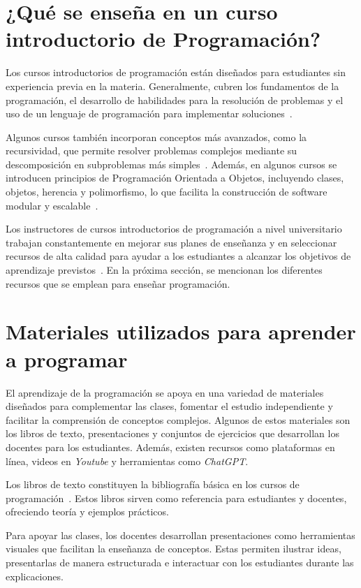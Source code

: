 \documentclass{article}
\begin{document}
\section{¿Qué se enseña en un curso introductorio de Programación?}\label{sec:contents}

Los cursos introductorios de programación están diseñados para estudiantes sin experiencia previa en la materia. Generalmente, cubren los fundamentos de la programación, el desarrollo de habilidades para la resolución de problemas y el uso de un lenguaje de programación para implementar soluciones~\cite{Medeiros2019}.

Algunos cursos también incorporan conceptos más avanzados, como la recursividad, que permite resolver problemas complejos mediante su descomposición en subproblemas más simples~\cite{cs50_harvard,mit_60001}. Además, en algunos cursos se introducen principios de Programación Orientada a Objetos, incluyendo clases, objetos, herencia y polimorfismo, lo que facilita la construcción de software modular y escalable~\cite{cs50_harvard, mit_60001}.

Los instructores de cursos introductorios de programación a nivel universitario trabajan constantemente en mejorar sus planes de enseñanza y en seleccionar recursos de alta calidad para ayudar a los estudiantes a alcanzar los objetivos de aprendizaje previstos~\cite{NAS2018}. En la próxima sección, se mencionan los diferentes recursos que se emplean para enseñar programación.

\section{Materiales utilizados para aprender a programar}\label{sec:resources}

El aprendizaje de la programación se apoya en una variedad de materiales diseñados para complementar las clases, fomentar el estudio independiente y facilitar la comprensión de conceptos complejos. Algunos de estos materiales son los libros de texto, presentaciones y conjuntos de ejercicios que desarrollan los docentes para los estudiantes. Además, existen recursos como plataformas en línea, videos en \textit{Youtube} y herramientas como \textit{ChatGPT}.

Los libros de texto constituyen la bibliografía básica en los cursos de programación~\cite{wong2022}. Estos libros sirven como referencia para estudiantes y docentes, ofreciendo teoría y ejemplos prácticos.

Para apoyar las clases, los docentes desarrollan presentaciones como herramientas visuales que facilitan la enseñanza de conceptos. Estas permiten ilustrar ideas, presentarlas de manera estructurada e interactuar con los estudiantes durante las explicaciones.
\end{document}
